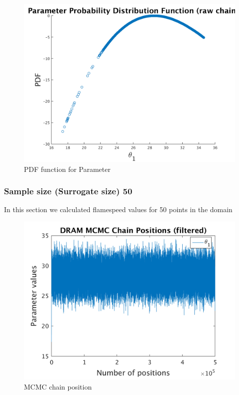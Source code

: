 \begin{figure}[H]
  
  \centering
   \includegraphics[scale=0.75]{53_results/output_20/ip_logLike_unified}
   \caption{PDF function for Parameter }
\end{figure}


\subsubsection{Sample size (Surrogate size) 50 }


In this section we calculated flamespeed values for 50 points in the domain 
\begin{figure}[H]
  
  \centering
   \includegraphics[scale=0.75]{53_results/output_50/simple_ip_chain_pos_filt}
   \caption{MCMC chain position }
\end{figure}


